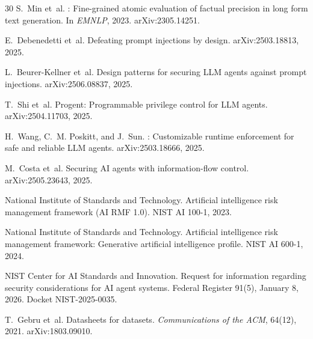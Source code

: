 ﻿\documentclass[11pt]{article}
\begin{document}
\begin{thebibliography}{30}
S.~Min et~al.
: Fine-grained atomic evaluation of factual precision in
  long form text generation.
\newblock In \emph{EMNLP}, 2023.
\newblock arXiv:2305.14251.

E.~Debenedetti et~al.
\newblock Defeating prompt injections by design.
\newblock arXiv:2503.18813, 2025.

L.~Beurer-Kellner et~al.
\newblock Design patterns for securing {LLM} agents against prompt injections.
\newblock arXiv:2506.08837, 2025.

T.~Shi et~al.
\newblock Progent: Programmable privilege control for {LLM} agents.
\newblock arXiv:2504.11703, 2025.

H.~Wang, C.~M. Poskitt, and J.~Sun.
: Customizable runtime enforcement for safe and reliable
  {LLM} agents.
\newblock arXiv:2503.18666, 2025.

M.~Costa et~al.
\newblock Securing {AI} agents with information-flow control.
\newblock arXiv:2505.23643, 2025.

National Institute of Standards and Technology.
\newblock Artificial intelligence risk management framework ({AI RMF} 1.0).
\newblock NIST AI 100-1, 2023.

National Institute of Standards and Technology.
\newblock Artificial intelligence risk management framework: Generative
  artificial intelligence profile.
\newblock NIST AI 600-1, 2024.

NIST Center for AI Standards and Innovation.
\newblock Request for information regarding security considerations for {AI}
  agent systems.
\newblock Federal Register 91(5), January 8, 2026. Docket NIST-2025-0035.

T.~Gebru et~al.
\newblock Datasheets for datasets.
\newblock \emph{Communications of the ACM}, 64(12), 2021.
\newblock arXiv:1803.09010.

\end{thebibliography}
\end{document}
